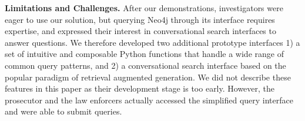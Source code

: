 \textbf{Limitations and Challenges.}
%
After our demonstrations, investigators were eager to use our solution, but querying Neo4j through its interface requires expertise, and expressed their interest in conversational search interfaces to answer questions. We therefore developed two additional prototype interfaces 1) a set of intuitive and composable Python functions that handle a wide range of common query patterns,
and 2) a conversational search interface based on the popular paradigm of retrieval augmented generation. We did not describe these features in this paper as their development stage is too early. However, the prosecutor and the law enforcers actually accessed the simplified query interface and were able to submit queries.    
